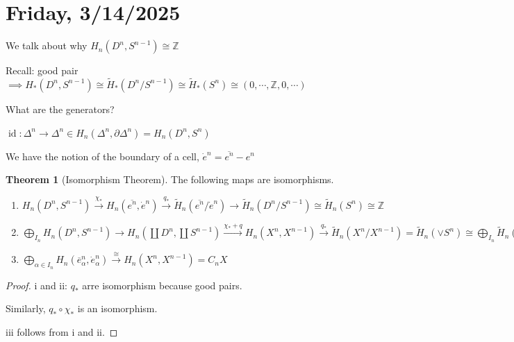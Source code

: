 \documentclass{article}
\theoremstyle{definition}
\newtheorem{theorem}{Theorem}
\begin{document}
    \section*{Friday, 3/14/2025}
    
    We talk about why \(H_n(D^n, S^{n-1}) \cong \mathbb{Z}\) 

    Recall: good pair \(\implies H_{\ast} (D^n, S^{n-1}) \cong \widetilde{H}_{\ast} (D^n / S^{n-1}) \cong \widetilde{H}_{\ast} (S^n) \cong (0, \cdots , \mathbb{Z} , 0, \cdots)\) 

    What are the generators?

    \(\operatorname{id}: \Delta^n \to \Delta^n \in H_n(\Delta^n, \partial \Delta^n) = H_n(D^n, S^n)\) 
    
    We have the notion of the boundary of a cell, \(\dot{e}^n = \overline{e^n} - e^n\)

    \begin{theorem}
        [Isomorphism Theorem] The following maps are isomorphisms.

        \begin{enumerate}[label=\roman*)]
            \item \(H_n(D^n, S^{n-1}) \xrightarrow{\chi_{\ast}} H_n(\overline{e^n}, \dot{e}^n) \xrightarrow{q_{\ast}} \widetilde{H}_n(\overline{e^n} / \dot{e}^n) \to \widetilde{H}_n(D^n / S^{n-1}) \cong \widetilde{H}_n(S^n)\cong \mathbb{Z} \)  
            
            \item \(\bigoplus_{I_n} H_n(D^n, S^{n-1}) \to H_n\left(\coprod D^n, \coprod S^{n-1}\right) \xrightarrow{\chi_{\ast} +q} H_n(X^n, X^{n-1}) \xrightarrow{q_{\ast}} \widetilde{H}_n(X^n / X^{n-1}) = \widetilde{H}_n(\vee S^n) \cong \bigoplus_{I_n} \widetilde{H}_n(S^n) \cong \bigoplus_{I_n} \mathbb{Z}\) 
            
            \item \(\bigoplus_{\alpha \in I_n} H_n \left( \overline{e}^n_{\alpha} , \dot{e}^n_\alpha \right) \xrightarrow{\cong} H_n(X^n, X^{n-1}) = C_n X\) 

        \end{enumerate} 
    \end{theorem}

    \begin{proof}
        i and ii: \(q_{\ast}\) arre isomorphism because good pairs.
        
        Similarly, \(q_{\ast} \circ \chi_{\ast}\) is an isomorphism.

        iii follows from i and ii.
    \end{proof}
\end{document}
